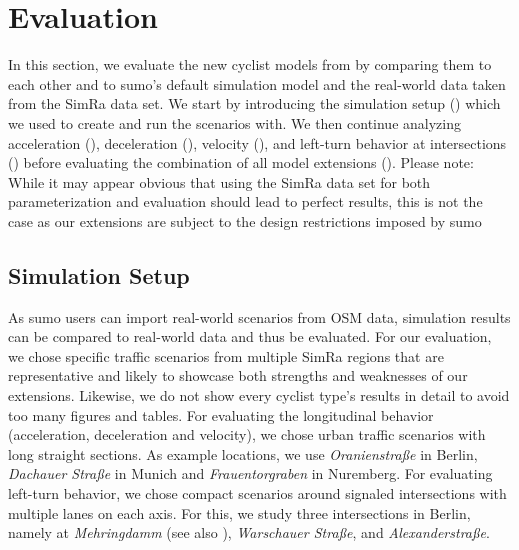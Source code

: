 \section{Evaluation}
\label{sec:evaluation_sumo}
In this section, we evaluate the new cyclist models from  by comparing them to each other and to \ac{sumo}'s default simulation model and the real-world data taken from the SimRa data set.
We start by introducing the simulation setup () which we used to create and run the scenarios with.
We then continue analyzing acceleration (), deceleration (), velocity (), and left-turn behavior at intersections () before evaluating the combination of all model extensions ().
Please note: While it may appear obvious that using the SimRa data set for both parameterization and evaluation should lead to perfect results, this is not the case as our extensions are subject to the design restrictions imposed by \ac{sumo}

\subsection{Simulation Setup}
\label{subsec:simulation_setup}
As \ac{sumo} users can import real-world scenarios from OSM data, simulation results can be compared to real-world data and thus be evaluated.
For our evaluation, we chose specific traffic scenarios from multiple SimRa regions that are representative and likely to showcase both strengths and weaknesses of our extensions.
Likewise, we do not show every cyclist type's results in detail to avoid too many figures and tables.
For evaluating the longitudinal behavior (acceleration, deceleration and velocity), we chose urban traffic scenarios with long straight sections.
As example locations, we use \textit{Oranienstraße} in Berlin, \textit{Dachauer Straße} in Munich and \textit{Frauentorgraben} in Nuremberg.
For evaluating left-turn behavior, we chose compact scenarios around signaled intersections with multiple lanes on each axis.
For this, we study three intersections in Berlin, namely at \textit{Mehringdamm} (see also ), \textit{Warschauer Straße}, and \textit{Alexanderstraße}.


